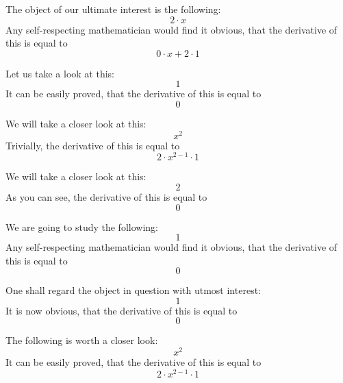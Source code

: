 \documentclass{article}
\begin{document}
The object of our ultimate interest is the following:
\begin{equation}
2 \cdot x 
\end{equation}
Any self-respecting mathematician would find it obvious, that the derivative of this is equal to
\begin{equation}
0 \cdot x + 2 \cdot 1 
\end{equation}

Let us take a look at this:
\begin{equation}
1 
\end{equation}
It can be easily proved, that the derivative of this is equal to
\begin{equation}
0 
\end{equation}

We will take a closer look at this:
\begin{equation}
x ^{2 } 
\end{equation}
Trivially, the derivative of this is equal to
\begin{equation}
2 \cdot x ^{2 - 1 } \cdot 1 
\end{equation}

We will take a closer look at this:
\begin{equation}
2 
\end{equation}
As you can see, the derivative of this is equal to
\begin{equation}
0 
\end{equation}

We are going to study the following:
\begin{equation}
1 
\end{equation}
Any self-respecting mathematician would find it obvious, that the derivative of this is equal to
\begin{equation}
0 
\end{equation}

One shall regard the object in question with utmost interest:
\begin{equation}
1 
\end{equation}
It is now obvious, that the derivative of this is equal to
\begin{equation}
0 
\end{equation}

The following is worth a closer look:
\begin{equation}
x ^{2 } 
\end{equation}
It can be easily proved, that the derivative of this is equal to
\begin{equation}
2 \cdot x ^{2 - 1 } \cdot 1 
\end{equation}
\end{document}
